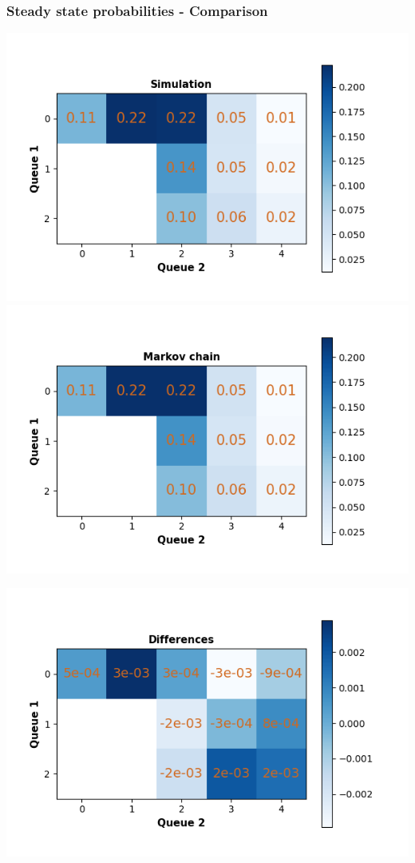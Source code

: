 \begin{frame}
    \frametitle{Steady state probabilities - Comparison}

    \centering
    \includegraphics[scale=0.35]{Bin/state_probs_comparison/simulation.png}
    \includegraphics[scale=0.35]{Bin/state_probs_comparison/markov.png}
    
    \includegraphics[scale=0.4]{Bin/state_probs_comparison/diff.png}

\end{frame}
